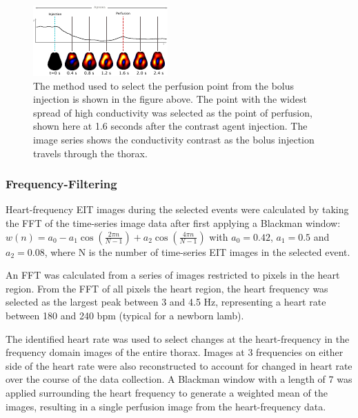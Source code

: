 \begin{figure}
\centering
\includegraphics[width=\textwidth]{chapter3-perfusion_analysis/imgs/fig-methodsBolus.pdf}
\caption[Selection of the bolus signal]{
The method used to select the perfusion point from the bolus injection is shown 
in the figure above. The point with the widest spread of high conductivity was 
selected as the point of perfusion, shown here at 1.6 seconds after the contrast 
agent injection. The image series shows the conductivity contrast as the bolus 
injection travels through the thorax.
}
\label{fig:methodsBolus}
\end{figure}


\subsubsection{Frequency-Filtering} \label{freqVent}

Heart-frequency EIT images during the selected events were calculated 
by taking the FFT of the time-series image data after first applying a Blackman window: 
$w(n)=a_{0}-a_{1}\cos \left({\frac {2\pi n}{N-1}}\right)+a_{2}\cos \left({\frac {4\pi n}{N-1}}\right)$ 
with $a_{0} = 0.42$, $a_{1} = 0.5$ and $a_{2} = 0.08$, where N is the number of time-series 
EIT images in the selected event.

An FFT was calculated from a series of images restricted to pixels in the heart 
region. From the FFT 
of all pixels the heart region, the heart frequency was selected as the largest 
peak between 3 and 4.5 Hz, representing a heart rate between 180 
and 240 bpm (typical for a newborn lamb).

The identified heart rate was used to select changes at the heart-frequency 
in the frequency domain images of the entire thorax. 
Images at 3 frequencies on either side of the heart rate were also reconstructed 
to account for changed in heart rate over the course of the data collection.
A Blackman window with a length of 7 was applied 
surrounding the heart frequency to generate a weighted mean of the images, resulting in 
a single perfusion image from the heart-frequency data. 
 
